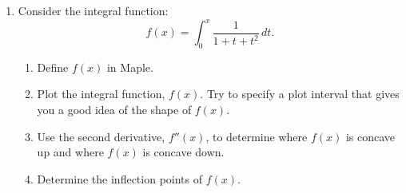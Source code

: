 \begin{enumerate}
\begin{enumerate}
    \end{enumerate}
    \item   Consider the integral function: \[f(x) = \displaystyle\int_{0}^x \dfrac{1}{1 + t + t^2} \, dt.\]
    \begin{enumerate}
        \item Define $f(x)$ in Maple.
        \item Plot the integral function, $f(x)$. Try to specify a plot interval that gives you a good idea of the shape of $f(x)$.
        \item Use the second derivative, $f''(x)$, to determine where $f(x)$ is concave up and where $f(x)$ is concave down.
        \item Determine the inflection points of $f(x)$.
    \end{enumerate}
\end{enumerate}
